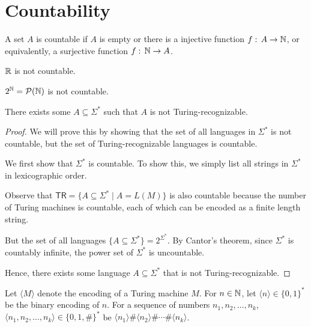\section{Countability}

\vspace{\parskip}

\begin{definition}
    A set $A$ is countable if $A$ is empty or there is a injective function $f:\, A \to \mathbb{N}$, or equivalently, a surjective function $f:\, \mathbb{N} \to A$.
\end{definition}

\begin{theorem}
    $\mathbb{R}$ is not countable.
\end{theorem}

\begin{theorem}
    $2^{\mathbb{N}} = \mathcal{P}(\mathbb{N})$ is not countable.
\end{theorem}

\begin{corollary}
    There exists some $A \subseteq \Sigma^*$ such that $A$ is not Turing-recognizable.
\end{corollary}

\begin{proof}
    We will prove this by showing that the set of all languages in $\Sigma^*$ is not countable, but the set of Turing-recognizable languages is countable.

    We first show that $\Sigma^*$ is countable. To show this, we simply list all strings in $\Sigma^*$ in lexicographic order.

    Observe that $\mathsf{TR} = \{ A \subseteq \Sigma^* \mid A = L(M) \}$ is also countable because the number of Turing machines is countable, each of which can be encoded as a finite length string.

    But the set of all languages $\{ A \subseteq \Sigma^* \} = 2^{\Sigma^*}$. By Cantor's theorem, since $\Sigma^*$ is countably infinite, the power set of $\Sigma^*$ is uncountable.

    Hence, there exists some language $A \subseteq \Sigma^*$ that is not Turing-recognizable.
\end{proof}

Let $\langle M \rangle$ denote the encoding of a Turing machine $M$. For $n \in \mathbb{N}$, let $\langle n \rangle \in \{0,1\}^*$ be the binary encoding of $n$. For a sequence of numbers $n_1,n_2,\ldots,n_k$, $\langle n_1,n_2,\ldots,n_k \rangle \in \{0,1,\#\}^*$ be $\langle n_1 \rangle \# \langle n_2 \rangle \# \cdots \# \langle n_k \rangle$.

